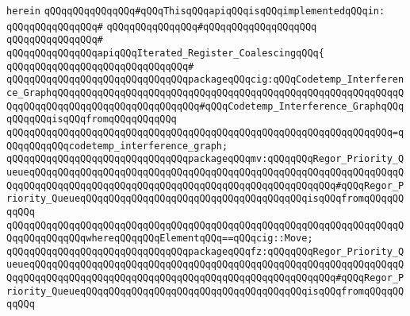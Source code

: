 \verb|herein|\newline
\newline
\verb|qQQqqQQqqQQqqQQq#qQQqThisqQQqapiqQQqisqQQqimplementedqQQqin:|\newline
\verb|qQQqqQQqqQQqqQQq#|\newline
\verb|qQQqqQQqqQQqqQQq#qQQqqQQqqQQqqQQqqQQq|\newline
\verb|qQQqqQQqqQQqqQQq#|\newline
\verb|qQQqqQQqqQQqqQQqapiqQQqIterated_Register_CoalescingqQQq{|\newline
\verb|qQQqqQQqqQQqqQQqqQQqqQQqqQQqqQQq#|\newline
\verb|qQQqqQQqqQQqqQQqqQQqqQQqqQQqqQQqpackageqQQqcig:qQQqCodetemp_Interference_GraphqQQqqQQqqQQqqQQqqQQqqQQqqQQqqQQqqQQqqQQqqQQqqQQqqQQqqQQqqQQqqQQqqQQqqQQqqQQqqQQqqQQqqQQqqQQqqQQq#qQQqCodetemp_Interference_GraphqQQqqQQqqQQqisqQQqfromqQQqqQQqqQQq|\newline
\verb|qQQqqQQqqQQqqQQqqQQqqQQqqQQqqQQqqQQqqQQqqQQqqQQqqQQqqQQqqQQqqQQqqQQq=qQQqqQQqqQQqcodetemp_interference_graph;|\newline
\newline
\verb|qQQqqQQqqQQqqQQqqQQqqQQqqQQqqQQqpackageqQQqmv:qQQqqQQqRegor_Priority_QueueqQQqqQQqqQQqqQQqqQQqqQQqqQQqqQQqqQQqqQQqqQQqqQQqqQQqqQQqqQQqqQQqqQQqqQQqqQQqqQQqqQQqqQQqqQQqqQQqqQQqqQQqqQQqqQQqqQQqqQQqqQQq#qQQqRegor_Priority_QueueqQQqqQQqqQQqqQQqqQQqqQQqqQQqqQQqqQQqqQQqisqQQqfromqQQqqQQqqQQq|\newline
\verb|qQQqqQQqqQQqqQQqqQQqqQQqqQQqqQQqqQQqqQQqqQQqqQQqqQQqqQQqqQQqqQQqqQQqqQQqqQQqqQQqqQQqwhereqQQqqQQqElementqQQq==qQQqcig::Move;|\newline
\newline
\verb|qQQqqQQqqQQqqQQqqQQqqQQqqQQqqQQqpackageqQQqfz:qQQqqQQqRegor_Priority_QueueqQQqqQQqqQQqqQQqqQQqqQQqqQQqqQQqqQQqqQQqqQQqqQQqqQQqqQQqqQQqqQQqqQQqqQQqqQQqqQQqqQQqqQQqqQQqqQQqqQQqqQQqqQQqqQQqqQQqqQQqqQQq#qQQqRegor_Priority_QueueqQQqqQQqqQQqqQQqqQQqqQQqqQQqqQQqqQQqqQQqisqQQqfromqQQqqQQqqQQq|\newline
